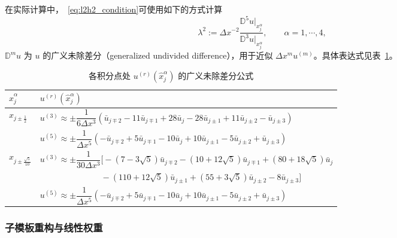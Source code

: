\documentclass[12pt,a4paper]{article}
\numberwithin{equation}{section}    %
\begin{document}
在实际计算中，~\eqref{eq:l2h2_condition}可使用如下的方式计算
\begin{equation}
    \label{eq:lambda_formula}
    \lambda^2 := \Delta x^{-2}
    \frac{\mathbb{D}^5 u\big|_{x^\alpha_j}}{\mathbb{D}^3 u\big|_{x^\alpha_j}},
    \qquad \alpha = 1, \cdots, 4,
\end{equation}
$\mathbb{D}^m u$ 为 $u$ 的广义未除差分（generalized undivided difference），用于近似 $\Delta x^m u^{(m)}$。具体表达式见表~\ref{tab:derivatives}。
\begin{table}[!htbp]
    \centering
    \caption{各积分点处 $u^{(r)}(\hat{x}^\alpha_j)$ 的广义未除差分公式}
    \label{tab:derivatives}
    \begin{tabular}{ll}
        \hline
        $\hat{x}^\alpha_j$ & $u^{(r)}(\hat{x}^\alpha_j)$ \\
        \hline
        \multirow{2}{*}{$x_{j\pm\frac{1}{2}}$}
        & $u^{(3)} \approx \pm\dfrac{1}{6\Delta x^3}
          (\bar{u}_{j\mp 2} - 11\bar{u}_{j\mp 1} + 28\bar{u}_j
          - 28\bar{u}_{j\pm 1} + 11\bar{u}_{j\pm 2} - \bar{u}_{j\pm 3})$ \\[12pt]
        & $u^{(5)} \approx \pm\dfrac{1}{\Delta x^5}
          (-\bar{u}_{j\mp 2} + 5\bar{u}_{j\mp 1} - 10\bar{u}_j
          + 10\bar{u}_{j\pm 1} - 5\bar{u}_{j\pm 2} + \bar{u}_{j\pm 3})$ \\[12pt]
        \hline
        \multirow{3}{*}{$x_{j\pm\frac{\sqrt{5}}{10}}$}
        & $u^{(3)} \approx \pm\dfrac{1}{30\Delta x^3}
          \bigl[-(7 - 3\sqrt{5})\bar{u}_{j\mp 2}
          - (10 + 12\sqrt{5})\bar{u}_{j\mp 1}
          + (80 + 18\sqrt{5})\bar{u}_j$ \\
        & $\quad\quad\quad\quad\quad\quad\quad\;
          -(110 + 12\sqrt{5})\bar{u}_{j\pm 1}
          + (55 + 3\sqrt{5})\bar{u}_{j\pm 2}
          - 8\bar{u}_{j\pm 3}\bigr]$ \\[6pt]
        & $u^{(5)} \approx \pm\dfrac{1}{\Delta x^5}
          (-\bar{u}_{j\mp 2} + 5\bar{u}_{j\mp 1} - 10\bar{u}_j
          + 10\bar{u}_{j\pm 1} - 5\bar{u}_{j\pm 2} + \bar{u}_{j\pm 3})$ \\[8pt]
        \hline
    \end{tabular}
\end{table}

\subsubsection{子模板重构与线性权重}
\end{document}

